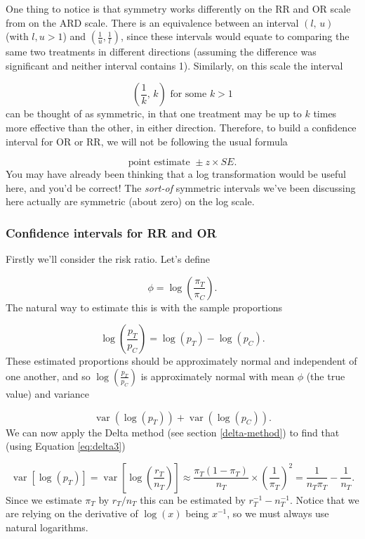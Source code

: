 \documentclass[
  openany]{book}
\theoremstyle{definition}
\theoremstyle{definition}
\theoremstyle{definition}
\theoremstyle{definition}
\theoremstyle{remark}
\begin{document}
One thing to notice is that symmetry works differently on the RR and OR scale from on the ARD scale. There is an equivalence between an interval \(\left(l,\,u\right)\) (with \(l,u>1\)) and \(\left(\frac{1}{u},\frac{1}{l}\right)\), since these intervals would equate to comparing the same two treatments in different directions (assuming the difference was significant and neither interval contains 1). Similarly, on this scale the interval

\[\left(\frac{1}{k},\,k\right) \text{ for some }k>1 \]
can be thought of as symmetric, in that one treatment may be up to \(k\) times more effective than the other, in either direction. Therefore, to build a confidence interval for OR or RR, we will not be following the usual formula

\[\text{point estimate } \pm{z\times{SE}}.\]
You may have already been thinking that a log transformation would be useful here, and you'd be correct! The \emph{sort-of} symmetric intervals we've been discussing here actually are symmetric (about zero) on the log scale.

\hypertarget{confidence-intervals-for-rr-and-or}{%
\subsubsection{Confidence intervals for RR and OR}\label{confidence-intervals-for-rr-and-or}}

Firstly we'll consider the risk ratio. Let's define

\[ \phi = \log\left(\frac{\pi_T}{\pi_C}\right).\]
The natural way to estimate this is with the sample proportions

\[\log\left(\frac{p_T}{p_C}\right) = \log\left(p_T\right) - \log\left(p_C\right).\]
These estimated proportions should be approximately normal and independent of one another, and so \(\log\left(\frac{p_T}{p_C}\right)\) is approximately normal with mean \(\phi\) (the true value) and variance

\[\operatorname{var}\left(\log\left(p_T\right)\right) + \operatorname{var}\left(\log\left(p_C\right)\right). \]
We can now apply the Delta method (see section \ref{delta-method}) to find that (using Equation \eqref{eq:delta3})

\[\operatorname{var}\left[\log\left(p_T\right)\right] = \operatorname{var}\left[\log\left(\frac{r_T}{n_T}\right)\right] \approx \frac{\pi_T\left(1-\pi_T\right)}{n_T}\times{\left(\frac{1}{\pi_T}\right)^2} = \frac{1}{n_T\pi_T} - \frac{1}{n_T}. \]
Since we estimate \(\pi_T\) by \(r_T/n_T\) this can be estimated by \(r_T^{-1} - n_T^{-1}\). Notice that we are relying on the derivative of \(\log\left(x\right)\) being \(x^{-1}\), so we must always use natural logarithms.
\end{document}
